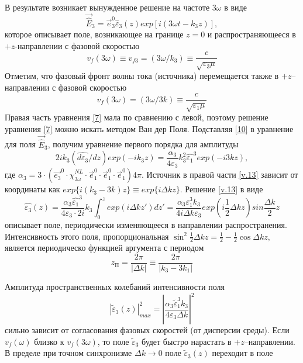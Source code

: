 \documentclass[a4paper]{article}
\begin{document}
\begin{itemize}
В результате  возникает вынужденное решение на частоте $3\omega$ в виде 
\begin{equation}\label{10}
	\vec{\hat{E}}_{3}=\vec{e}_{3}^{0}\hat{\varepsilon}_{3}(z)exp\left[i(3\omega t-k_{3}z)\right],
\end{equation}
которое описывает поле, возникающее на границе $z=0$ и распространяющееся в $+z$-направлении  с фазовой скоростью
\begin{equation}
	v_{f}(3\omega)\equiv v_{f3}=(3\omega/k_{3})\equiv\frac{c}{\sqrt{\varepsilon_{3}\mu}}
\end{equation}
Отметим, что фазовый фронт волны тока (источника) перемещается также в $+z$–направлении с фазовой скоростью 
\begin{equation}
	v_{f}(3\omega)=(3\omega/3k)\equiv\frac{c}{\sqrt{\varepsilon_{1}\mu}}
\end{equation}
Правая часть уравнения \eqref{7} мала по сравнению с левой, поэтому решение уравнения \eqref{7} можно искать методом Ван дер Поля. Подставляя \eqref{10} в уравнение для поля   $\vec{\hat{E}}_{3}$, получим уравнение первого порядка для амплитуды 
\begin{equation}\label{v.13}
	2ik_{3}(\hat{d\varepsilon_{3}}/dz)exp(-ik_{3}z)=\frac{\alpha_{3}}{4\varepsilon_{3}}k_{3}^{2}\hat{\varepsilon_{1}}^{3}exp(-i3kz),\tag{В.13}
\end{equation}
где $\alpha_{3}=3\cdot\left(\vec{e_{3}}^{0}\cdot\hat{\chi}_{3\omega}^{NL}\cdot\vec{e}^{0}_{1}\cdot\vec{e}^{0}_{1}\cdot\vec{e}^{0}_{1}\right)4\pi$. Источник в правой части \eqref{v.13} зависит от координаты как $exp\{i(k_{3}-3k)z\}\equiv exp\{i\Delta kz\}.$ Решение \eqref{v.13} в виде
\begin{equation}\label{14}
	\hat{\varepsilon_{3}}(z)=\frac{\alpha_{3}\hat{\varepsilon_{1}}^{3}}{4\varepsilon_{3}\cdot2i}k_{3}\int_{0}^{z}exp(i\Delta kz')dz'=\frac{\alpha_{3}\varepsilon_{1}^{3}k_{3}}{4i\Delta k\varepsilon_{3}}exp\left(i\frac{1}{2}\Delta kz\right)sin\frac{\Delta k}{2}z
\end{equation}
описывает поле, периодически изменяющееся в направлении распространения. Интенсивность этого поля, пропорциональная $\sin^{2}\frac{1}{2}\Delta kz=\frac{1}{2}-\frac{1}{2}\cos\Delta kz,$ является периодическо функцией аргумента с периодом
\begin{equation}\label{15}
	z_{\text{П}}=\frac{2\pi}{\left|\Delta k\right|}\equiv\frac{2\pi}{\left|k_{3}-3k_{1}\right|}
\end{equation}

Амплитуда пространственных колебаний интенсивности поля 
\begin{equation}
	\label{16}
	\left|\tilde{\varepsilon}_{3}(z)\right|^{2}_{max}=\left|\frac{\alpha_{3}\tilde{\varepsilon}_{1}^{3} k_{3}}{4\varepsilon_{3}\Delta k}\right|^{2}
\end{equation}
сильно зависит от согласования фазовых скоростей (от дисперсии среды). Если $v_{f}(\omega)$ близко к $v_{f}(3\omega)$, то поле $\tilde{\varepsilon}_{3}$ будет быстро нарастать в $+z$–направлении. В пределе при точном синхронизме $\Delta k\rightarrow0$  поле  $\tilde{\varepsilon}_{3}(z)$  переходит в поле 


\end{itemize}
\end{document}
